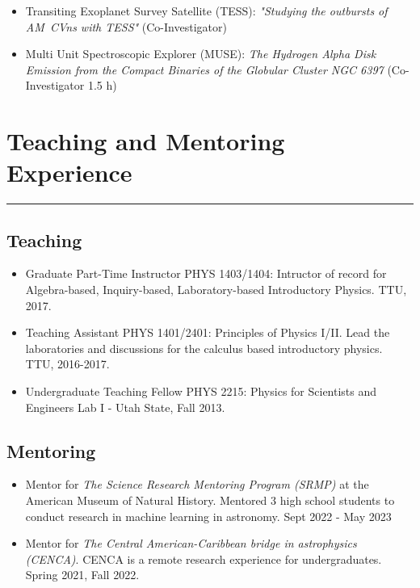 \documentclass[letterpaper,10pt]{article}
\begin{document}
  

\begin{itemize}[label=$\blacktriangleright$]
      \item   Transiting Exoplanet Survey Satellite (TESS): \emph{"Studying the outbursts of AM~CVns with TESS"} (Co-Investigator)
  \end{itemize}


  \begin{itemize}[label=$\blacktriangleright$]
        \item Multi Unit Spectroscopic Explorer (MUSE): \emph{The Hydrogen Alpha Disk Emission from the Compact Binaries of the Globular Cluster NGC 6397} (Co-Investigator 1.5 h)
  \end{itemize}


\section*{Teaching and Mentoring Experience}

\hrule
\vspace{.3 cm}
\subsection*{Teaching}

\begin{itemize}[label=$\blacktriangleright$]
\item   Graduate Part-Time Instructor PHYS 1403/1404: Intructor of record for Algebra-based, Inquiry-based, Laboratory-based Introductory Physics. TTU, 2017.  
 
 \item   Teaching Assistant  PHYS 1401/2401: Principles of Physics I/II. Lead the laboratories and discussions for the calculus based introductory physics. TTU, 2016-2017.
  

 \item Undergraduate Teaching Fellow  PHYS 2215: Physics for Scientists and Engineers Lab I -  Utah State, Fall 2013.
 
 
 
  \end{itemize}
  
  \subsection*{Mentoring}

  
  \begin{itemize}[label=$\blacktriangleright$]
  
  \item Mentor for \emph{The Science Research Mentoring Program (SRMP)} at the American Museum of Natural History. Mentored 3 high school students to conduct research in machine learning in astronomy. Sept 2022 - May 2023
   \item Mentor for \emph{The Central American-Caribbean bridge in astrophysics (CENCA)}. CENCA is a remote research experience for undergraduates. Spring 2021, Fall 2022.
\end{itemize}
  
\end{document}
